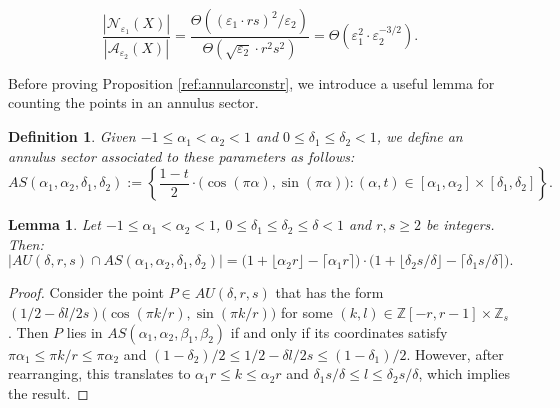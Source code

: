 \documentclass[12pt]{article}
\newtheorem{dfn}[thm]{Definition}
\newtheorem{lem}[thm]{Lemma}
\newcommand{\eps}{\varepsilon}
\begin{document}
 $$
\dfrac{|\mathcal{N}_{\eps_1}(X)|}{|\mathcal{A}_{\eps_2}(X)|} = \frac{\Theta\left((\eps_1\cdot rs)^2/\eps_2\right)}{\Theta\left(\sqrt{\eps_2}\cdot r^2s^2\right)} = \Theta(  \eps_1^2\cdot \eps_2^{-3/2}).$$


Before proving Proposition \ref{ref:annularconstr}, we introduce a useful lemma for counting the points in an annulus sector.

\begin{dfn}
    Given $-1\leq \alpha_1<\alpha_2<1$ and $0\leq \delta_1\leq \delta_2<1$, we define an annulus sector associated to these parameters as follows:
    $$AS(\alpha_1,\alpha_2,\delta_1,\delta_2):=\left\{ \frac{1-t}{2}\cdot \big( \cos\left(\pi \alpha\right), \sin\left(\pi\alpha\right)\big) : (\alpha,t)\in [\alpha_1,\alpha_2]\times [\delta_1,\delta_2]\right\}.$$
\end{dfn}

\begin{lem}\label{lem:annulus-count}
        Let $-1\leq \alpha_1<\alpha_2<1$, $0\leq \delta_1\leq \delta_2\leq \delta<1$ and $r,s\geq 2$ be integers. Then: 
        $$\big|AU(\delta,r,s)\cap AS(\alpha_1,\alpha_2,\delta_1,\delta_2)\big|=\big(1+\lfloor \alpha_2r\rfloor-\lceil \alpha_1r\rceil\big)\cdot\big(1+\lfloor \delta_2s/\delta\rfloor-\lceil  \delta_1s/\delta\rceil\big).$$
\end{lem}

\begin{proof}
 Consider the point $P\in AU(\delta,r,s)$ that has the form $(1/2-\delta l/2s)\big(\cos(\pi k/r),\sin(\pi k/r)\big)$ for some $(k,l)\in \mathbb{Z}[-r,r-1]\times \mathbb{Z}_s$. Then $P$ lies in $AS(\alpha_1,\alpha_2,\beta_1,\beta_2)$ if and only if its coordinates satisfy $\pi\alpha_1\leq \pi k/r\leq \pi\alpha_2$ and $(1-\delta_2)/2\leq 1/2-\delta l/2s\leq (1-\delta_1)/2$. However, after rearranging, this translates to $\alpha_1 r\leq k\leq \alpha_2 r$ and $\delta_1s/\delta\leq l\leq\delta_2s/\delta$, which implies the result. 
\end{proof}

\end{document}
